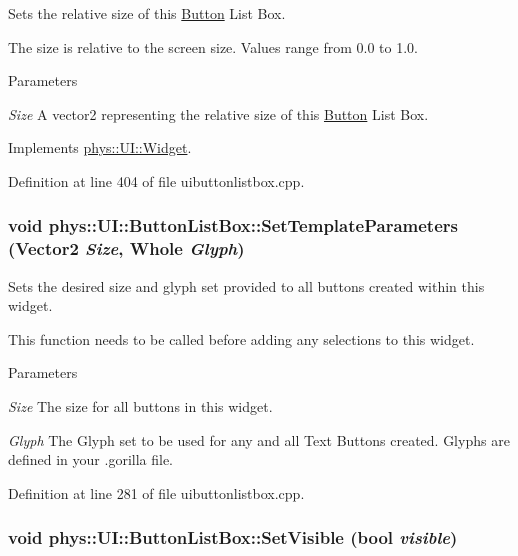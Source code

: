 Sets the relative size of this \hyperlink{classphys_1_1UI_1_1Button}{Button} List Box. 

The size is relative to the screen size. Values range from 0.0 to 1.0. 
\begin{DoxyParams}{Parameters}
\item[{\em Size}]A vector2 representing the relative size of this \hyperlink{classphys_1_1UI_1_1Button}{Button} List Box. \end{DoxyParams}


Implements \hyperlink{classphys_1_1UI_1_1Widget_ad5af5f04b60d43341037df6b0e329bbd}{phys::UI::Widget}.



Definition at line 404 of file uibuttonlistbox.cpp.

\hypertarget{classphys_1_1UI_1_1ButtonListBox_adafec2d6141603bcfe6002e217fa476f}{
\subsubsection[{SetTemplateParameters}]{\setlength{\rightskip}{0pt plus 5cm}void phys::UI::ButtonListBox::SetTemplateParameters ({\bf Vector2} {\em Size}, \/  {\bf Whole} {\em Glyph})}}
\label{d4/dd7/classphys_1_1UI_1_1ButtonListBox_adafec2d6141603bcfe6002e217fa476f}


Sets the desired size and glyph set provided to all buttons created within this widget. 

This function needs to be called before adding any selections to this widget. 
\begin{DoxyParams}{Parameters}
\item[{\em Size}]The size for all buttons in this widget. \item[{\em Glyph}]The Glyph set to be used for any and all Text Buttons created. Glyphs are defined in your .gorilla file. \end{DoxyParams}


Definition at line 281 of file uibuttonlistbox.cpp.

\hypertarget{classphys_1_1UI_1_1ButtonListBox_acee378e954050801fa8fffe835441bf4}{
\subsubsection[{SetVisible}]{\setlength{\rightskip}{0pt plus 5cm}void phys::UI::ButtonListBox::SetVisible (bool {\em visible})}}
\label{d4/dd7/classphys_1_1UI_1_1ButtonListBox_acee378e954050801fa8fffe835441bf4}


